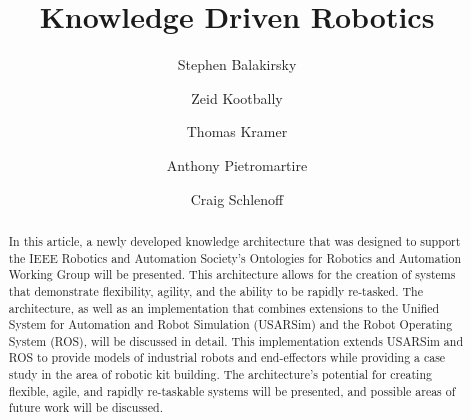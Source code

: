 \documentclass[preprint,12pt]{elsarticle}
\begin{document}
\begin{frontmatter}



\title{Knowledge Driven Robotics}


\author[NIST]{Stephen Balakirsky}
\author[NIST,UMD]{Zeid Kootbally}
\author[CATHU,NIST]{Thomas Kramer}
\author[NIST]{Anthony Pietromartire}
\author[NIST]{Craig Schlenoff}

\address[CATHU]{Catholic University of America, Washington, DC, USA}
\address[NIST]{National Institute of Standards and Technology, Gaithersburg, MD USA}
\address[UMD]{University of Maryland, College Park, MD, USA}

\begin{abstract}
In this article,  a newly developed knowledge architecture that was designed to support the IEEE Robotics and Automation Society's Ontologies for Robotics and Automation Working Group
will be presented. This architecture allows for the creation of systems that demonstrate flexibility, agility, and the ability to be rapidly re-tasked. The architecture, as well as 
an implementation that combines extensions to the Unified System for Automation and Robot Simulation (USARSim) and the Robot Operating System (ROS), will be discussed 
in detail. This implementation extends USARSim and ROS to provide models of industrial robots and end-effectors while providing a case study in the area of robotic kit building. 
The architecture's potential for creating flexible, agile, and rapidly re-taskable systems will be presented, and possible areas of future work will be discussed.
\end{abstract}

\begin{keyword}


\end{keyword}

\end{frontmatter}
\end{document}

